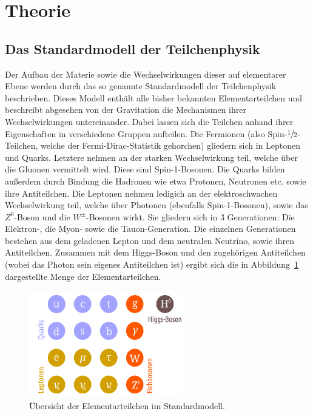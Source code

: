 \section{Theorie}
\label{sec:theorie}

\subsection{Das Standardmodell der Teilchenphysik}

Der Aufbau der Materie sowie die Wechselwirkungen dieser auf elementarer Ebene werden durch das so
genannte Standardmodell der Teilchenphysik beschrieben. Dieses Modell enthält alle bisher bekannten
Elementarteilchen und beschreibt abgesehen von der Gravitation die Mechanismen ihrer Wechselwirkungen
untereinander. Dabei lassen sich die Teilchen anhand ihrer Eigenschaften in verschiedene Gruppen aufteilen.
Die Fermionen (also Spin-$\sfrac{1}{2}$-Teilchen, welche der Fermi-Dirac-Statistik gehorchen) gliedern sich in
Leptonen und Quarks. Letztere nehmen an der starken Wechselwirkung teil, welche über die Gluonen vermittelt wird.
Diese sind Spin-1-Bosonen. Die Quarks bilden außerdem durch Bindung die Hadronen wie etwa Protonen, Neutronen etc. sowie ihre Antiteilchen. Die
Leptonen nehmen ledigich an der elektroschwachen Wechselwirkung teil, welche über Photonen (ebenfalls
Spin-1-Bosonen), sowie das $Z^0$-Boson und die $W^{\pm}$-Bosonen wirkt. Sie gliedern sich in 3 Generationen: Die Elektron-, die Myon- sowie die Tauon-Generation. Die einzelnen Generationen bestehen aus dem geladenen Lepton und dem neutralen Neutrino, sowie ihren Antiteilchen. Zusammen mit dem Higgs-Boson und den
zugehörigen Antiteilchen (wobei das Photon sein eigenes Antiteilchen ist) ergibt sich die
in Abbildung~\ref{fig:sm} dargestellte Menge der Elementarteilchen.
%
\begin{figure}[htb]
  \centering
  \includegraphics[width=0.6\textwidth]{figures/standardmodell.png}
  \caption{Übersicht der Elementarteilchen im Standardmodell.}
  \label{fig:sm}
\end{figure}
